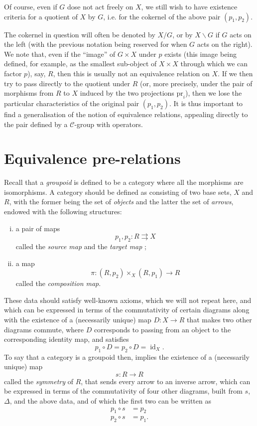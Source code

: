 \documentclass{article}
\renewcommand{\cal}[1]{{\mathcal{#1}}}
\newcommand{\pr}{\mathrm{pr}}
\DeclareMathOperator{\id}{id}
\newcommand{\oldpage}[1]{\marginpar{\footnotesize$\Big\vert$ \textit{p.~#1}}}
\begin{document}
Of course, even if $G$ dose not act freely on $X$, we still wish to have existence criteria for a quotient of $X$ by $G$, i.e. for the cokernel of the above pair $(p_1,p_2)$.

The cokernel in question will often be denoted by $X/G$, or by $X\backslash G$ if $G$ acts on the left (with the previous notation being reserved for when $G$ acts on the right).
We note that, even if the ``image'' of $G\times X$ under $p$ exists (this image being defined, for example, as the smallest sub-object of $X\times X$ through which we can factor $p$), say, $R$, then this is usually not an equivalence relation on $X$.
If we then try to pass directly to the quotient under $R$ (or, more precisely, under the pair of morphisms from $R$ to $X$ induced by the two projections $\pr_i$), then we lose the particular characteristics of the original pair $(p_1,p_2)$.
It is thus important to find a generalisation of the notion of equivalence relations, appealing directly to the pair defined by a $\cal{C}$-group with operators.


\section{Equivalence pre-relations}
\label{4}

Recall that a \emph{groupoid} is defined to be a category where all the morphisms are isomorphisms.
A category should be defined as consisting of two base sets, $X$ and $R$, with the former being the set of \emph{objects} and the latter the set of \emph{arrows}, endowed with the following structures:
\oldpage{212-08}
\begin{enumerate}[(i)]
  \item a pair of maps
    \[
      p_1,p_2\colon R\rightrightarrows X
    \]
    called the \emph{source map} and the \emph{target map} ;
  \item a map
    \[
      \pi\colon(R,p_2)\times_X(R,p_1) \to R
    \]
    called the \emph{composition map}.
\end{enumerate}
These data should satisfy well-known axioms, which we will not repeat here, and which can be expressed in terms of the commutativity of certain diagrams along with the existence of a (necessarily unique) map $D\colon X\to R$ that makes two other diagrams commute, where $D$ corresponds to passing from an object to the corresponding identity map, and satisfies
\[
  p_1\circ D = p_2\circ D = \id_X.
\]
To say that a category is a groupoid then, implies the existence of a (necessarily unique) map
\[
  s\colon R\to R
\]
called the \emph{symmetry} of $R$, that sends every arrow to an inverse arrow, which can be expressed in terms of the commutativity of four other diagrams, built from $s$, $\Delta$, and the above data, and of which the first two can be written as
\[
  \begin{aligned}
    p_1\circ s &= p_2
  \\p_2\circ s &= p_1.
  \end{aligned}
\]
\end{document}
